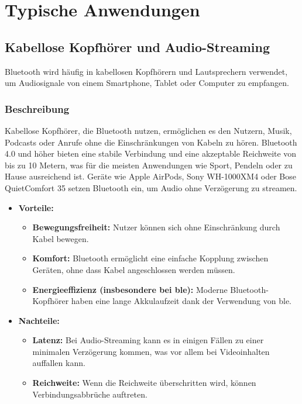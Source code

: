 \section{Typische Anwendungen}

\subsection{Kabellose Kopfhörer und Audio-Streaming}
Bluetooth wird häufig in kabellosen Kopfhörern und Lautsprechern verwendet, um Audiosignale von einem Smartphone, Tablet oder Computer zu empfangen.

\subsubsection{Beschreibung}
Kabellose Kopfhörer, die Bluetooth nutzen, ermöglichen es den Nutzern, Musik, Podcasts oder Anrufe ohne die Einschränkungen von Kabeln zu hören. Bluetooth 4.0 und höher bieten eine stabile Verbindung und eine akzeptable Reichweite von bis zu 10 Metern, was für die meisten Anwendungen wie Sport, Pendeln oder zu Hause ausreichend ist. Geräte wie Apple AirPods, Sony WH-1000XM4 oder Bose QuietComfort 35 setzen Bluetooth ein, um Audio ohne Verzögerung zu streamen.  \cite{Gaum:2023}

\begin{itemize}
	\item \textbf{Vorteile:}
	\begin{itemize}
		\item \textbf{Bewegungsfreiheit:} Nutzer können sich ohne Einschränkung durch Kabel bewegen.
		\item \textbf{Komfort:} Bluetooth ermöglicht eine einfache Kopplung zwischen Geräten, ohne dass Kabel angeschlossen werden müssen.
		\item \textbf{Energieeffizienz (insbesondere bei \ac{ble}):} Moderne Bluetooth-Kopfhörer haben eine lange Akkulaufzeit dank der Verwendung von \ac{ble}.
	\end{itemize}
		\item \textbf{Nachteile:}
	\begin{itemize}
		\item \textbf{Latenz:} Bei Audio-Streaming kann es in einigen Fällen zu einer minimalen Verzögerung kommen, was vor allem bei Videoinhalten auffallen kann.
		\item \textbf{Reichweite:} Wenn die Reichweite überschritten wird, können Verbindungsabbrüche auftreten.
	\end{itemize}
\end{itemize}


